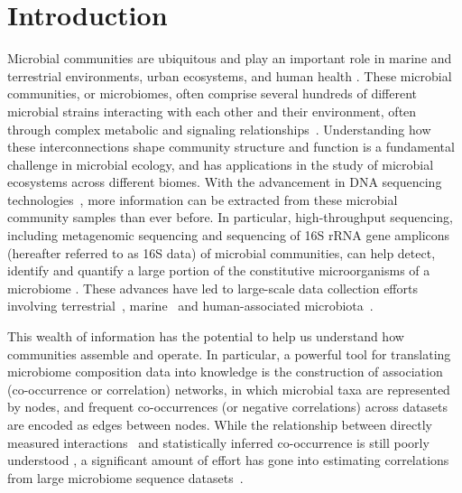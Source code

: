 
\section*{Introduction}

Microbial communities are ubiquitous and play an important role in marine and terrestrial environments, urban ecosystems, and human health \cite{lima-mendezDeterminantsCommunityStructure2015a,Thompson2017,royo-llonchCompendium530Metagenomeassembled2021,tedersooFungalBiogeographyGlobal2014,dankoGlobalMetagenomicMap2021,mclellanMicrobiomeUrbanWaters2015,HumanMicrobiomeProjectConsortium2012}.
  These microbial communities, or microbiomes, often comprise several hundreds of different microbial strains interacting with each other and their environment, often through complex metabolic and signaling relationships~\cite{zelezniakMetabolicDependenciesDrive2015,Ghoul2016,coyteUnderstandingCompetitionCooperation2019,DSouza2018}.
  Understanding how these interconnections shape community structure and function is a fundamental challenge in microbial ecology, and has applications in the study of microbial ecosystems across different biomes.
  With the advancement in DNA sequencing technologies~\cite{huNextgenerationSequencingTechnologies2021,buermansNextGenerationSequencing2014,Narihiro2017},  more information can be extracted from these microbial community samples than ever before.
  In particular, high-throughput sequencing, including metagenomic sequencing and sequencing of 16S rRNA gene amplicons (hereafter referred to as 16S data) of microbial communities, can help detect, identify and quantify a large portion of the constitutive microorganisms of a microbiome \cite{ju16SRRNAGene2015,Jovel2016,quinceShotgunMetagenomicsSampling2017,sedlarBioinformaticsStrategiesTaxonomy2017}.
  These advances have led to large-scale data collection efforts involving terrestrial~\cite{Thompson2017,gilbertMeetingReportTerabase2010,tedersooFungalBiogeographyGlobal2014}, marine~\cite{lima-mendezDeterminantsCommunityStructure2015a,royo-llonchCompendium530Metagenomeassembled2021} and human-associated microbiota~\cite{HumanMicrobiomeProjectConsortium2012,proctorIntegrativeHumanMicrobiome2019,Lloyd-Price2016}.

 This wealth of information has the potential to help us understand how communities assemble and operate.
 In particular, a powerful tool for translating microbiome composition data into knowledge is the construction of association (co-occurrence or correlation) networks, in which  microbial taxa are represented by nodes, and frequent co-occurrences (or negative correlations) across datasets are encoded as edges between nodes.
 While the relationship between directly measured interactions~\cite{lubbeExometabolomicAnalysisCrossFeeding2017,Jian2020,Hsu2019} and statistically inferred co-occurrence is still poorly understood \cite{Zuniga2017,Rottjers2018}, a significant amount of effort has gone into estimating correlations from large microbiome sequence datasets~\cite{faustMicrobialCooccurrenceRelationships2012,leeCrosskingdomCooccurrenceNetworks2022,faustMicrobialInteractionsNetworks2012a,maEarthMicrobialCooccurrence2020a}.

